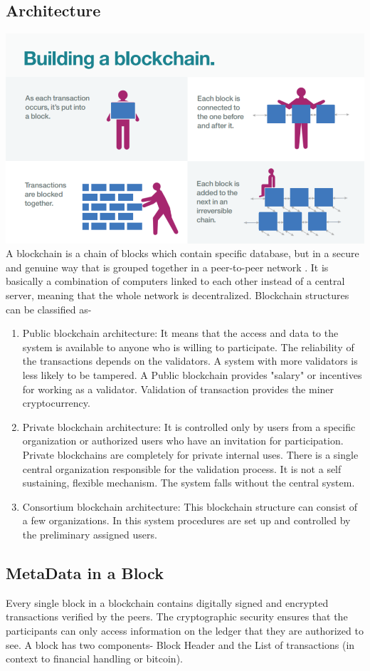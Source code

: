 \documentclass{report}
\begin{document}
\subsection{Architecture}
\includegraphics[scale=0.50]{voorbeeld3.png}
\\
A blockchain is a chain of blocks which contain specific database, but in a secure and genuine way that is grouped together in a peer-to-peer network . It is basically a combination of computers linked to each other instead of a central server, meaning that the whole network is decentralized.\cite{WinNT25}
Blockchain structures can be classified as-
\begin{enumerate}
\item Public blockchain architecture: It means that the access and data to the system is available to anyone who is willing to participate. The reliability of the transactions depends on the validators. A system with more validators is less likely to be tampered. A Public blockchain provides "salary" or incentives for working as a validator. Validation of transaction provides the miner cryptocurrency.
\item Private blockchain architecture: It is controlled only by users from a specific organization or authorized users who have an invitation for participation. Private blockchains are completely for private internal uses. There is a single central organization responsible for the validation process. It is not a self sustaining, flexible mechanism. The system falls without the central system.
\item Consortium blockchain architecture: This blockchain structure can consist of a few organizations. In this system procedures are set up and controlled by the preliminary assigned users.
\end{enumerate}
\subsection{MetaData in a Block}
Every single block in a blockchain contains digitally signed and encrypted transactions verified by the peers. The cryptographic security ensures that the participants can only access information on the ledger that they are authorized to see. A block has two components- Block Header and the List of transactions (in context to financial handling or bitcoin).\cite{WinNT26}
\end{document}
